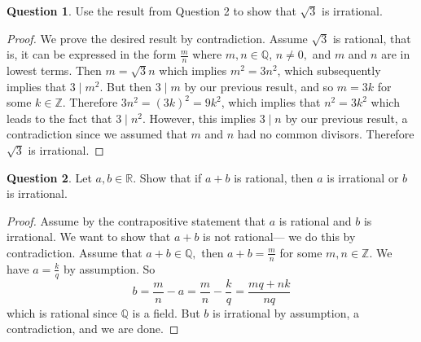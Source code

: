 \documentclass{article}
\theoremstyle{definition}
\newtheorem{question}{Question}
\begin{document}
\begin{question}
    Use the result from Question 2 to show that $\sqrt3$ is irrational.
\end{question}
\begin{proof}
    We prove the desired result by contradiction. Assume $\sqrt3$ is rational, that is, it can be expressed in the form $\frac{m}{n}$ where $m,n \in \mathbb{Q}$, $n \neq 0,$ and $m$ and $n$ are in lowest terms. Then $m=\sqrt3n$ which implies $m^2=3n^2$, which subsequently implies that $3 \mid m^2.$ But then $3 \mid m$ by our previous result, and so $m=3k$ for some $k \in \mathbb{Z}$. Therefore $3n^2=(3k)^2=9k^2$, which implies that $n^2 = 3k^2$ which leads to the fact that $3 \mid n^2.$ However, this implies $3 \mid n$ by our previous result, a contradiction since we assumed that $m$ and $n$ had no common divisors. Therefore $\sqrt3$ is irrational.
\end{proof}
\begin{question}
    Let $a,b \in \mathbb{R}.$ Show that if $a+b$ is rational, then $a$ is irrational or $b$ is irrational.
\end{question}
\begin{proof}
    Assume by the contrapositive statement that $a$ is rational and $b$ is irrational. We want to show that $a+b$ is not rational— we do this by contradiction. Assume that $a+b \in \mathbb{Q},$ then $a+b=\frac{m}{n}$ for some $m,n \in \mathbb{Z}.$ We have $a=\frac{k}{q}$ by assumption. So 
    \[b=\frac{m}{n}-a=\frac{m}{n}-\frac{k}{q}=\frac{mq+nk}{nq}\]
which is rational since $\mathbb{Q}$ is a field. But $b$ is irrational by assumption, a contradiction, and we are done. 
\end{proof}
\end{document}
